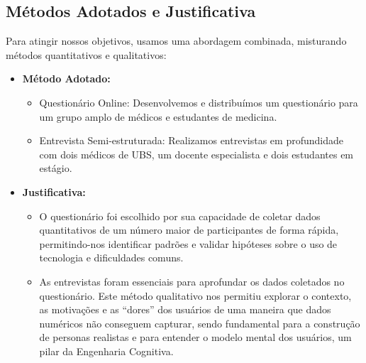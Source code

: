 \documentclass[12pt, a4paper, oneside]{abntex2}
\begin{document}
\subsection{Métodos Adotados e Justificativa}
Para atingir nossos objetivos, usamos uma abordagem combinada, misturando métodos quantitativos e qualitativos:
\begin{itemize}
    \item \textbf{Método Adotado:}
    \begin{itemize}
        \item Questionário Online: Desenvolvemos e distribuímos um questionário para um grupo amplo de médicos e estudantes de medicina.
        \item Entrevista Semi-estruturada: Realizamos entrevistas em profundidade com dois médicos de UBS, um docente especialista e dois estudantes em estágio.
    \end{itemize}
    \item \textbf{Justificativa:}
    \begin{itemize}
        \item O questionário foi escolhido por sua capacidade de coletar dados quantitativos de um número maior de participantes de forma rápida, permitindo-nos identificar padrões e validar hipóteses sobre o uso de tecnologia e dificuldades comuns.
        \item As entrevistas foram essenciais para aprofundar os dados coletados no questionário. Este método qualitativo nos permitiu explorar o contexto, as motivações e as ``dores'' dos usuários de uma maneira que dados numéricos não conseguem capturar, sendo fundamental para a construção de personas realistas e para entender o modelo mental dos usuários, um pilar da Engenharia Cognitiva.
    \end{itemize}
\end{itemize}
\end{document}
